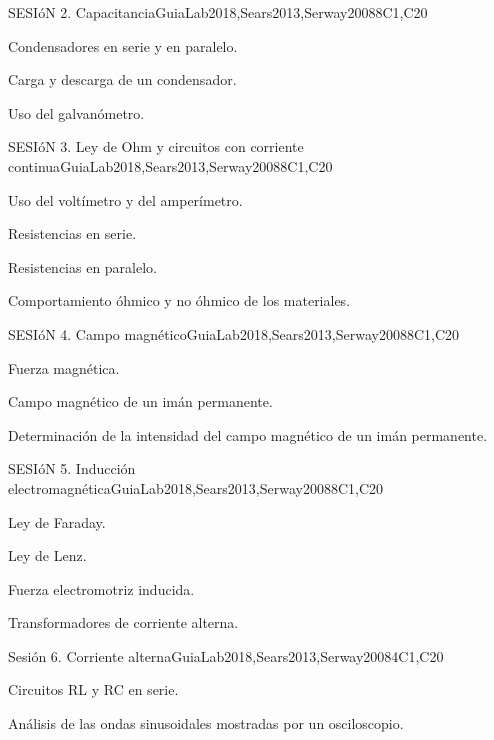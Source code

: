 \begin{syllabus}
\begin{unit}{SESIóN 2. Capacitancia}{}{GuiaLab2018,Sears2013,Serway2008}{8}{C1,C20}
\begin{topics}
      \item Condensadores en serie y en paralelo.
      \item Carga y descarga de un condensador.
      \item Uso del galvanómetro. 
\end{topics}
\end{unit}

\begin{unit}{SESIóN 3. Ley de Ohm y circuitos con corriente continua}{}{GuiaLab2018,Sears2013,Serway2008}{8}{C1,C20}
\begin{topics}
      \item Uso del voltímetro y del amperímetro.
      \item Resistencias en serie.
      \item Resistencias en paralelo.
      \item Comportamiento óhmico y no óhmico de los materiales.
\end{topics}
\end{unit}

\begin{unit}{SESIóN 4. Campo magnético}{}{GuiaLab2018,Sears2013,Serway2008}{8}{C1,C20}
\begin{topics}
      \item Fuerza magnética.
      \item Campo magnético de un imán permanente.
      \item Determinación de la intensidad del campo magnético de un imán permanente.
   \end{topics}
\end{unit}

\begin{unit}{SESIóN 5. Inducción electromagnética}{}{GuiaLab2018,Sears2013,Serway2008}{8}{C1,C20}
\begin{topics}
	\item Ley de Faraday.
	\item Ley de Lenz.
	\item Fuerza electromotriz inducida.
	\item Transformadores de corriente alterna.
   \end{topics}
\end{unit}

\begin{unit}{Sesión 6. Corriente alterna}{}{GuiaLab2018,Sears2013,Serway2008}{4}{C1,C20}
   \begin{topics}
	\item Circuitos RL y RC en serie.
	\item Análisis de las ondas sinusoidales mostradas por un osciloscopio.
   \end{topics}
\end{unit}



\begin{coursebibliography}
\end{coursebibliography}

\end{syllabus}
